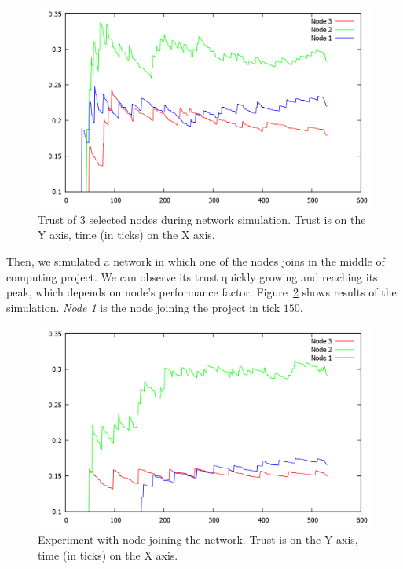 \begin{figure}
\centering
\includegraphics[width=\textwidth]{diagrams/trust1.png}
\caption{Trust of 3 selected nodes during network simulation. Trust is on the Y axis, time (in ticks) on the X axis.}
\label{f:trust1}
\end{figure}

Then, we simulated a network in which one of the nodes joins in the middle of computing project. We can observe its trust quickly growing and reaching its peak, which depends on node's performance factor. Figure~\ref{f:trust_join} shows results of the simulation. \emph{Node 1} is the node joining the project in tick $150$. 

\begin{figure}
\centering
\includegraphics[width=\textwidth]{diagrams/trust_join.png}
\caption{Experiment with node joining the network. Trust is on the Y axis, time (in ticks) on the X axis.}
\label{f:trust_join}
\end{figure}


